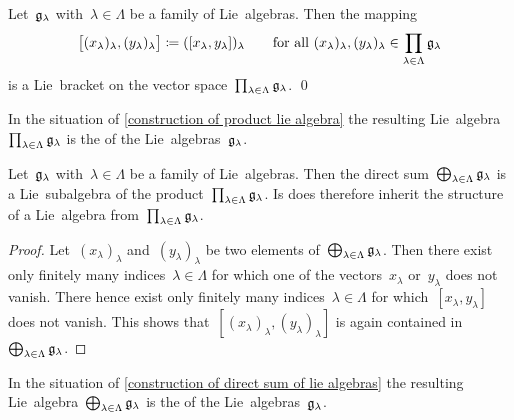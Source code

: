 \begin{proposition}
  \label{construction of product lie algebra}
  Let~$\mathfrak{g}_{\lambda}$ with~$\lambda \in \Lambda$ be a family of Lie~algebras.
  Then the mapping
  \[
    \bigl[ (x_\lambda)_\lambda, (y_\lambda)_\lambda \bigr]
    \coloneqq
    ( [x_\lambda, y_\lambda] )_\lambda
    \qquad
    \text{for all~$(x_\lambda)_\lambda, (y_\lambda)_\lambda \in \prod_{\lambda \in \Lambda} \mathfrak{g}_\lambda$}
  \]
  is a Lie~bracket on the vector space~$\prod_{\lambda \in \Lambda} \mathfrak{g}_\lambda$.
  \qed
\end{proposition}


\begin{definition}
  In the situation of \cref{construction of product lie algebra} the resulting Lie~algebra~$\prod_{\lambda \in \Lambda} \mathfrak{g}_\lambda$ is the  of the Lie~algebras~$\mathfrak{g}_\lambda$.
\end{definition}


\begin{proposition}
  \label{construction of direct sum of lie algebras}
  Let~$\mathfrak{g}_\lambda$ with~$\lambda \in \Lambda$ be a family of Lie~algebras.
  Then the direct sum~$\bigoplus_{\lambda \in \Lambda} \mathfrak{g}_\lambda$ is a Lie~subalgebra of the product~$\prod_{\lambda \in \Lambda} \mathfrak{g}_\lambda$.
  Is does therefore inherit the structure of a Lie~algebra from~$\prod_{\lambda \in \Lambda} \mathfrak{g}_\lambda$.
\end{proposition}


\begin{proof}
  Let~$(x_\lambda)_\lambda$ and~$(y_\lambda)_\lambda$ be two elements of~$\bigoplus_{\lambda \in \Lambda} \mathfrak{g}_\lambda$.
  Then there exist only finitely many indices~$\lambda \in \Lambda$ for which one of the vectors~$x_\lambda$ or~$y_\lambda$ does not vanish.
  There hence exist only finitely many indices~$\lambda \in \Lambda$ for which~$[x_\lambda, y_\lambda]$ does not vanish.
  This shows that~$[ (x_\lambda)_\lambda, (y_\lambda)_\lambda ]$ is again contained in~$\bigoplus_{\lambda \in \Lambda} \mathfrak{g}_\lambda$.
\end{proof}


\begin{definition}
  In the situation of \cref{construction of direct sum of lie algebras} the resulting Lie~algebra~$\bigoplus_{\lambda \in \Lambda} \mathfrak{g}_\lambda$ is the  of the Lie~algebras~$\mathfrak{g}_\lambda$.
\end{definition}


